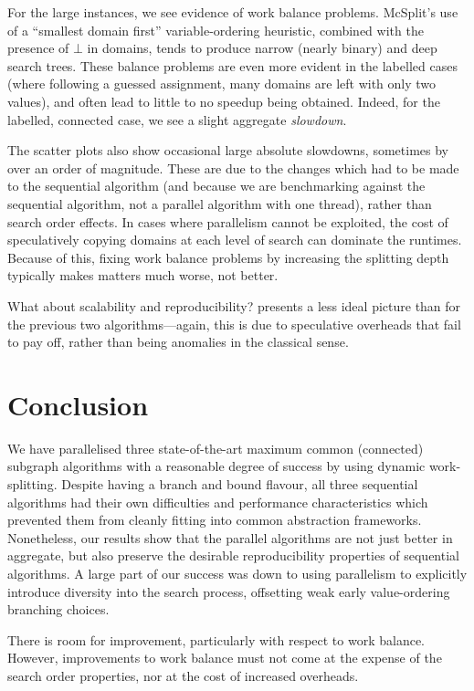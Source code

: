\documentclass{llncs}
\begin{document}
For the large instances, we see evidence of work balance problems. McSplit's use of a ``smallest
domain first'' variable-ordering heuristic, combined with the presence of $\bot$ in domains, tends
to produce narrow (nearly binary) and deep search trees. These balance problems are even more
evident in the labelled cases (where following a guessed assignment, many domains are left with only
two values), and often lead to little to no speedup being obtained. Indeed, for the labelled,
connected case, we see a slight aggregate \emph{slowdown}.

The scatter plots also show occasional large absolute slowdowns, sometimes by over an order of
magnitude.  These are due to the changes which had to be made to the sequential algorithm (and
because we are benchmarking against the sequential algorithm, not a parallel algorithm with one
thread), rather than search order effects. In cases where parallelism cannot be exploited, the cost
of speculatively copying domains at each level of search can dominate the runtimes. Because of this,
fixing work balance problems by increasing the splitting depth typically makes matters much worse,
not better.

What about scalability and reproducibility?  presents a
less ideal picture than for the previous two algorithms---again, this is due to speculative
overheads that fail to pay off, rather than being anomalies in the classical sense.

\section{Conclusion}

We have parallelised three state-of-the-art maximum common (connected) subgraph algorithms with a
reasonable degree of success by using dynamic work-splitting. Despite having a branch and bound
flavour, all three sequential algorithms had their own difficulties and performance characteristics
which prevented them from cleanly fitting into common abstraction frameworks. Nonetheless, our
results show that the parallel algorithms are not just better in aggregate, but also preserve the
desirable reproducibility properties of sequential algorithms. A large part of our success was down
to using parallelism to explicitly introduce diversity into the search process, offsetting weak
early value-ordering branching choices.

There is room for improvement, particularly with respect to work balance. However, improvements to
work balance must not come at the expense of the search order properties, nor at the cost of
increased overheads.
\end{document}
